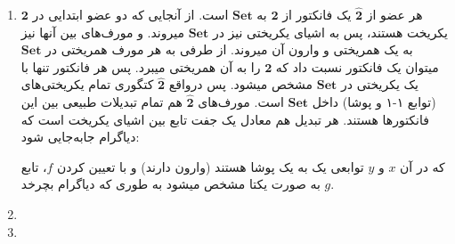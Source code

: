 \begin{enumerate}
    \item 
        هر عضو از $\hat{\mathbf{2}}$ یک فانکتور از $\mathbf{2}$ به $\mathbf{Set}$ است. از آنجایی که دو عضو ابتدایی در $\mathbf{2}$ یکریخت هستند، پس به اشیای یکریختی نیز در $\mathbf{Set}$ میروند. و مورف‌های بین آنها نیز به یک همریختی و وارون آن میروند. از طرفی به هر مورف همریختی در $\mathbf{Set}$ میتوان یک فانکتور نسبت داد که $\mathbf{2}$ را به آن همریختی میبرد.
         پس هر فانکتور تنها با یک یکریختی در $\mathbf{Set}$ مشخص میشود. پس درواقع $\hat{\mathbf{2}}$ کتگوری تمام یکریختی‌های (توابع ۱-۱ و پوشا) داخل $\mathbf{Set}$ است.
         مورف‌های $\hat{\mathbf{2}}$ هم تمام تبدیلات طبیعی بین این فانکتورها هستند.
        هر تبدیل هم معادل یک جفت تابع بین اشیای یکریخت است که دیاگرام جابه‌جایی شود:
         \begin{center}
         \end{center}
         که در آن $x$ و $y$ توابعی یک به یک پوشا هستند (وارون دارند) و با تعیین کردن $f$، تابع $g$ به صورت یکتا مشخص میشود به طوری که دیاگرام بچرخد.
    \item 
    \item 
\end{enumerate}